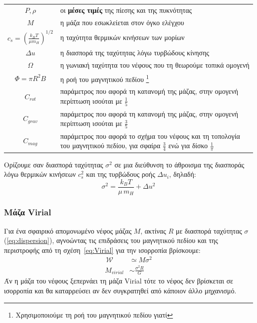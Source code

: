 \documentclass[a4paper,12pt]{memoir}
\newcommand{\WW}{\,\mathcal{W}}
\begin{document}
\begin{tabular}{|c p{9cm}}
$P,\rho$ &οι \textbf{μέσες τιμές} της πίεσης και της πυκνότητας \\
$M$ &η μάζα που εσωκλείεται στον όγκο ελέγχου\\
$c_s =\left( \frac{k_B T}{\mu m_H}\right) ^{1/2}$ &η ταχύτητα θερμικών κινήσεων των μορίων \\
$\Delta u$ &η διασπορά της ταχύτητας λόγω τυρβώδους κίνησης \\
$\Omega$ &η γωνιακή ταχύτητα του νέφους που τη θεωρούμε τοπικά ομογενή \\
$\Phi=\pi R^2 B$ &η ροή του μαγνητικού πεδίου \footnote{Χρησιμοποιούμε τη ροή του μαγνητικού πεδίου γιατί } \\
$C_{rot}$ &παράμετρος που αφορά τη κατανομή της μάζας, στην ομογενή περίπτωση ισούται με $\frac{1}{5}$ \\
$C_{grav}$ &παράμετρος που αφορά τη κατανομή της μάζας, στην ομογενή περίπτωση ισούται με $\frac{3}{5}$ \\
$C_{mag}$ &παράμετρος που αφορά το σχήμα του νέφους και τη τοπολογία του μαγνητικού πεδίου, για σφαίρα $\frac{3}{4}$ ενώ για δίσκο $\frac{1}{\pi}$
\end{tabular}

\medskip

Ορίζουμε σαν διασπορά ταχύτητας $\sigma ^2$ σε μια διεύθυνση το άθροισμα της διασποράς λόγω θερμικών κινήσεων $c_s ^2 $ και της τυρβώδους ροής $\Delta u _i $, δηλαδή:
\begin{equation}
\label{eq:dispersion}
\sigma ^2=\frac{k_B T}{\mu \, m_H}+ \Delta u^2
\end{equation} 

\subsubsection{Μάζα Virial}
\label{par:VirialMass}
Για ένα σφαιρικό απομονωμένο νέφος μάζας $M$, ακτίνας $R$ με διασπορά ταχύτητας $\sigma$ (\ref{eq:dispersion}), αγνοώντας τις επιδράσεις του μαγνητικού πεδίου και της περιστροφής από τη σχέση~\ref{eq:Virial} για την ισορροπία βρίσκουμε:
\begin{align}
\WW &\simeq M\sigma ^2 \\
M_{virial} &\sim \frac{\sigma ^2 R}{G} 
\end{align} 
Άν η μάζα του νέφους ξεπερνάει τη μάζα Virial τότε το νέφος δεν βρίσκεται σε ισορροπία και θα καταρρεύσει αν δεν συγκρατηθεί από κάποιον άλλο μηχανισμό.
\end{document}
